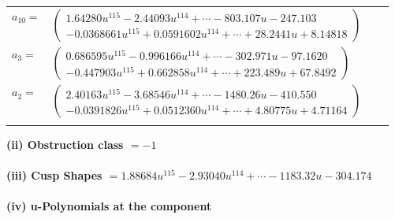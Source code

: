 \documentclass[1p]{elsarticle_modified}
\theoremstyle{definition}
\begin{document}
\begin{tabular}{m{7pt} m{180pt} m{7pt} m{180pt} }
\flushright $a_{10}=$&$\begin{pmatrix}1.64280 u^{115}-2.44093 u^{114}+\cdots-803.107 u-247.103\\-0.0368661 u^{115}+0.0591602 u^{114}+\cdots+28.2441 u+8.14818\end{pmatrix}$ \\
\flushright $a_{3}=$&$\begin{pmatrix}0.686595 u^{115}-0.996166 u^{114}+\cdots-302.971 u-97.1620\\-0.447903 u^{115}+0.662858 u^{114}+\cdots+223.489 u+67.8492\end{pmatrix}$ \\
\flushright $a_{2}=$&$\begin{pmatrix}2.40163 u^{115}-3.68546 u^{114}+\cdots-1480.26 u-410.550\\-0.0391826 u^{115}+0.0512360 u^{114}+\cdots+4.80775 u+4.71164\end{pmatrix}$\\&\end{tabular}
\flushleft \textbf{(ii) Obstruction class $= -1$}\\~\\
\flushleft \textbf{(iii) Cusp Shapes $= 1.88684 u^{115}-2.93040 u^{114}+\cdots-1183.32 u-304.174$}\\~\\
\newpage\renewcommand{\arraystretch}{1}
\flushleft \textbf{(iv) u-Polynomials at the component}\newline \\
\end{document}
